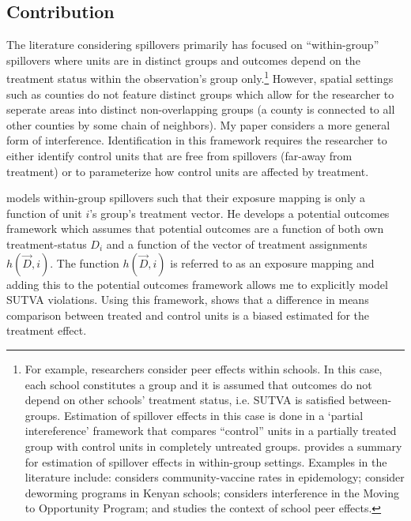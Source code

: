 \documentclass[11pt]{article}
\begin{document}

\subsection{Contribution}

The literature considering spillovers primarily has focused on ``within-group'' spillovers where units are in distinct groups and outcomes depend on the treatment status within the observation's group only.\footnote{For example, researchers consider peer effects within schools. In this case, each school constitutes a group and it is assumed that outcomes do not depend on other schools' treatment status, i.e. SUTVA is satisfied between-groups. Estimation of spillover effects in this case is done in a `partial intereference' framework that compares ``control'' units in a partially treated group with control units in completely untreated groups. \citet{Angelucci_DiMaro_2016} provides a summary for estimation of spillover effects in within-group settings. Examples in the literature include: \citet{Halloran_Struchiner_1995} considers community-vaccine rates in epidemology; \citet{Miguel_Kremer_2004} consider deworming programs in Kenyan schools; \citet{Sobel_2006} considers interference in the Moving to Opportunity Program; and \citet{Angrist_2014} studies the context of school peer effects.} 
However, spatial settings such as counties do not feature distinct groups which allow for the researcher to seperate areas into distinct non-overlapping groups (a county is connected to all other counties by some chain of neighbors). My paper considers a more general form of interference. Identification in this framework requires the researcher to either identify control units that are free from spillovers (far-away from treatment) or to parameterize how control units are affected by treatment.

\citet{Vazquez-Bare_2019} models within-group spillovers such that their exposure mapping is only a function of unit $i$'s group's treatment vector. He develops a potential outcomes framework which assumes that potential outcomes are a function of both own treatment-status $D_i$ and a function of the vector of treatment assignments $h(\vec{D}, i)$. The function $h(\vec{D}, i)$ is referred to as an exposure mapping and adding this to the potential outcomes framework allows me to explicitly model SUTVA violations. Using this framework, \citet{Vazquez-Bare_2019} shows that a difference in means comparison between treated and control units is a biased estimated for the treatment effect. 
\end{document}
